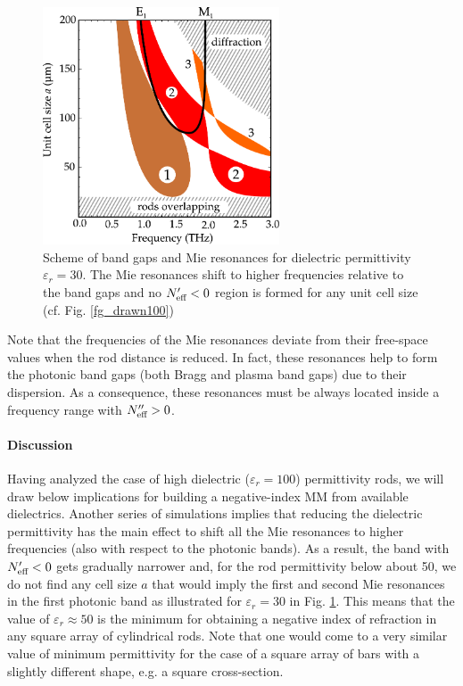 \begin{figure}
	\centering
    \includegraphics[width=7cm]{img/ERods_eps030_spacingscan_drawn_bands.pdf}
    \caption{Scheme of band gaps and Mie resonances for dielectric permittivity $\varepsilon_r = 30$. The Mie resonances shift to higher frequencies relative to the band gaps and no $N_{\text{eff} }'<0$ region is formed for any unit cell size (cf. Fig. \ref{fg_drawn100})}
\label{fg_drawn030}
\end{figure}

Note that the frequencies of the Mie resonances deviate from their free-space values when the rod distance is reduced. In fact, these resonances help to form the photonic band gaps (both Bragg and plasma band gaps) due to their dispersion. As a consequence, these resonances must be always located inside a frequency range with $N_{\text{eff} }''>0$.
\paragraph{Discussion}%
Having analyzed the case of high dielectric ($\varepsilon_r=100$) permittivity rods, we will draw below implications for building a negative-index MM from available dielectrics.  Another series of simulations implies that reducing the dielectric permittivity has the main effect to shift all the Mie resonances to higher frequencies (also with respect to the photonic bands). As a result, the band with $N_{\text{eff} }'<0$ gets gradually narrower and, for the rod permittivity below about 50, we do not find any cell size $a$ that would imply the first and second Mie resonances in the first photonic band as illustrated for $\varepsilon_r = 30$ in Fig. \ref{fg_drawn030}. This means that the value of $\varepsilon_{r} \approx 50$ is the minimum for obtaining a negative index of refraction in any square array of cylindrical rods. Note that one would come to a very similar value of minimum permittivity for the case of a square array of bars with a slightly different shape, e.g. a square cross-section. 

